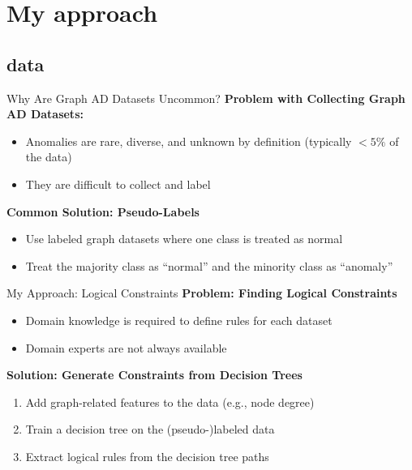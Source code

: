 \documentclass[aspectratio=169]{beamer}
\begin{document}
\section{My approach}

\subsection{data}


\begin{frame}{Why Are Graph AD Datasets Uncommon?}
    \textbf{Problem with Collecting Graph AD Datasets:}
    \begin{itemize}
        \item Anomalies are rare, diverse, and unknown by definition (typically $< 5\%$ of the data)
        \item They are difficult to collect and label
    \end{itemize}
    
    \textbf{Common Solution: Pseudo-Labels}
    \begin{itemize}
        \item Use labeled graph datasets where one class is treated as normal
        \item Treat the majority class as ``normal'' and the minority class as ``anomaly''
    \end{itemize}
\end{frame}

\begin{frame}{My Approach: Logical Constraints}
    \textbf{Problem: Finding Logical Constraints}
    \begin{itemize}
        \item Domain knowledge is required to define rules for each dataset
        \item Domain experts are not always available
    \end{itemize}
    
    \textbf{Solution: Generate Constraints from Decision Trees}
    \begin{enumerate}
        \item Add graph-related features to the data (e.g., node degree)
        \item Train a decision tree on the (pseudo-)labeled data
        \item Extract logical rules from the decision tree paths
    \end{enumerate}
\end{frame}
\end{document}
